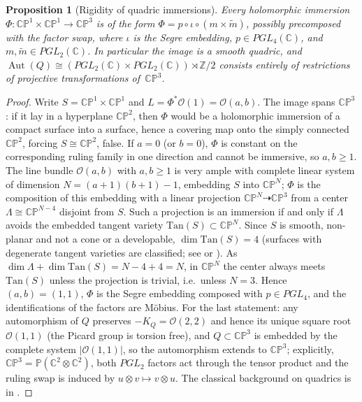 \documentclass[11pt]{amsart}
\theoremstyle{plain}
\newtheorem{proposition}[theorem]{Proposition}
\theoremstyle{definition}
\theoremstyle{remark}
\newcommand{\CC}{\mathbb{C}}
\newcommand{\ZZ}{\mathbb{Z}}
\newcommand{\CP}{\mathbb{CP}}
\newcommand{\Aut}{\operatorname{Aut}}
\begin{document}
\begin{proposition}[Rigidity of quadric immersions]\label{prop:immersion}
Every holomorphic immersion $\Phi\colon\CP^1\times\CP^1\to\CP^3$ is of the form
$\Phi=p\circ\iota\circ(m\times\tilde m)$, possibly precomposed with the factor swap, where $\iota$
is the Segre embedding, $p\in PGL_4(\CC)$, and $m,\tilde m\in PGL_2(\CC)$. In particular the image
is a smooth quadric, and $\Aut(Q)\cong(PGL_2(\CC)\times PGL_2(\CC))\rtimes\ZZ/2$ consists entirely
of restrictions of projective transformations of\, $\CP^3$.
\end{proposition}

\begin{proof}
Write $S=\CP^1\times\CP^1$ and $L=\Phi^*\mathcal O(1)=\mathcal O(a,b)$. The image spans $\CP^3$:
if it lay in a hyperplane $\CP^2$, then $\Phi$ would be a holomorphic immersion of a compact
surface into a surface, hence a covering map onto the simply connected $\CP^2$, forcing
$S\cong\CP^2$, false. If $a=0$ (or $b=0$), $\Phi$
is constant on the corresponding ruling family in one direction and cannot be immersive, so
$a,b\ge1$. The line bundle $\mathcal O(a,b)$ with $a,b\ge1$ is very ample with complete linear
system of dimension $N=(a+1)(b+1)-1$, embedding $S$ into $\CP^N$; $\Phi$ is the composition of
this embedding with a linear projection $\CP^N\dashrightarrow\CP^3$ from a center
$\Lambda\cong\CP^{N-4}$ disjoint from $S$. Such a projection is an immersion if and only if
$\Lambda$ avoids the embedded tangent variety $\mathrm{Tan}(S)\subset\CP^N$. Since $S$ is smooth,
non-planar and not a cone or a developable, $\dim\mathrm{Tan}(S)=4$ (surfaces with degenerate
tangent varieties are classified; see \cite{GriffithsHarris1979} or \cite[Ch.~I]{Zak1993}).
As $\dim\Lambda+\dim\mathrm{Tan}(S)=N-4+4=N$, in $\CP^N$ the center always meets
$\mathrm{Tan}(S)$ unless the projection is trivial, i.e.\ unless $N=3$. Hence $(a,b)=(1,1)$,
$\Phi$ is the Segre embedding composed with $p\in PGL_4$, and the identifications of the factors
are M\"obius. For the last statement: any automorphism of $Q$ preserves
$-K_Q=\mathcal O(2,2)$ and hence its unique square root $\mathcal O(1,1)$ (the Picard group is
torsion free), and $Q\subset\CP^3$ is embedded by the complete system $|\mathcal O(1,1)|$, so the
automorphism extends to $\CP^3$; explicitly, $\CP^3=\mathbb P(\CC^2\otimes\CC^2)$, both $PGL_2$
factors act through the tensor product and the ruling swap is induced by $u\otimes v\mapsto
v\otimes u$. The classical background on quadrics is in \cite[Ch.~6]{GriffithsHarris1978}.
\end{proof}
\end{document}
